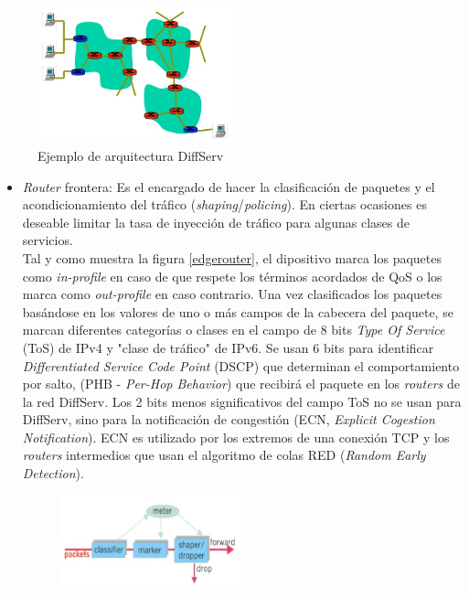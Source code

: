 	\begin{figure}[H]
			\centering
			\includegraphics[width=0.5\textwidth]{img/diffserv.PNG}
			\caption{Ejemplo de arquitectura DiffServ}
			\label{diffserv}
		\end{figure}
	
	\begin{itemize}
	    \item \textit{Router} frontera: Es el encargado de hacer la clasificación de paquetes y el acondicionamiento del tráfico (\textit{shaping}/\textit{policing}). En ciertas ocasiones es deseable limitar la tasa de inyección de tráfico para algunas clases de servicios. \\
	    Tal y como muestra la figura \ref{edgerouter}, el dipositivo marca los paquetes como \textit{in-profile} en caso de que respete los términos acordados de QoS o los marca como \textit{out-profile} en caso contrario. Una vez clasificados los paquetes basándose en los valores de uno o más campos de la cabecera del paquete, se marcan diferentes categorías o clases en el campo de 8 bits \textit{Type Of Service} (ToS) de IPv4 y "clase de tráfico" de IPv6. Se usan 6 bits para identificar \textit{Differentiated Service Code Point} (DSCP) que determinan el comportamiento por salto, (PHB - \textit{Per-Hop Behavior}) que recibirá el paquete en los \textit{routers} de la red DiffServ. Los 2 bits menos significativos del campo ToS no se usan para DiffServ, sino para la notificación de congestión (ECN, \textit{Explicit Cogestion Notification}). ECN es utilizado por los extremos de una conexión TCP y los \textit{routers} intermedios que usan el algoritmo de colas RED (\textit{Random Early Detection}).
	    \begin{figure}[H]
			\centering
			\includegraphics[width=0.5\textwidth]{img/edgerouter.PNG}

\end{figure}
\end{itemize}
